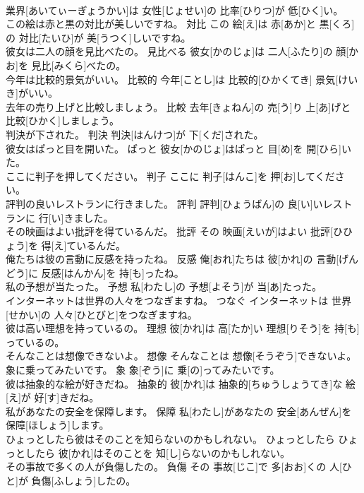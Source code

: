 \documentclass[8pt]{extreport}
\begin{document}
\begin{CJK}{UTF8}{min}
\\	業界[あいてぃーぎょうかい]は 女性[じょせい]の 比率[ひりつ]が 低[ひく]い。	
\\	この絵は赤と黒の対比が美しいですね。	対比	この 絵[え]は 赤[あか]と 黒[くろ]の 対比[たいひ]が 美[うつく]しいですね。	
\\	彼女は二人の顔を見比べたの。	見比べる	彼女[かのじょ]は 二人[ふたり]の 顔[かお]を 見比[みくら]べたの。	
\\	今年は比較的景気がいい。	比較的	今年[ことし]は 比較的[ひかくてき] 景気[けいき]がいい。	
\\	去年の売り上げと比較しましょう。	比較	去年[きょねん]の 売[う]り 上[あ]げと 比較[ひかく]しましょう。	
\\	判決が下された。	判決	判決[はんけつ]が 下[くだ]された。	
\\	彼女はぱっと目を開いた。	ぱっと	彼女[かのじょ]はぱっと 目[め]を 開[ひら]いた。	
\\	ここに判子を押してください。	判子	ここに 判子[はんこ]を 押[お]してください。	
\\	評判の良いレストランに行きました。	評判	評判[ひょうばん]の 良[い]いレストランに 行[い]きました。	
\\	その映画はよい批評を得ているんだ。	批評	その 映画[えいが]はよい 批評[ひひょう]を 得[え]ているんだ。	
\\	俺たちは彼の言動に反感を持ったね。	反感	俺[おれ]たちは 彼[かれ]の 言動[げんどう]に 反感[はんかん]を 持[も]ったね。	
\\	私の予想が当たった。	予想	私[わたし]の 予想[よそう]が 当[あ]たった。	
\\	インターネットは世界の人々をつなぎますね。	つなぐ	インターネットは 世界[せかい]の 人々[ひとびと]をつなぎますね。	
\\	彼は高い理想を持っているの。	理想	彼[かれ]は 高[たか]い 理想[りそう]を 持[も]っているの。	
\\	そんなことは想像できないよ。	想像	そんなことは 想像[そうぞう]できないよ。	
\\	象に乗ってみたいです。	象	象[ぞう]に 乗[の]ってみたいです。	
\\	彼は抽象的な絵が好きだね。	抽象的	彼[かれ]は 抽象的[ちゅうしょうてき]な 絵[え]が 好[す]きだね。	
\\	私があなたの安全を保障します。	保障	私[わたし]があなたの 安全[あんぜん]を 保障[ほしょう]します。	
\\	ひょっとしたら彼はそのことを知らないのかもしれない。	ひょっとしたら	ひょっとしたら 彼[かれ]はそのことを 知[し]らないのかもしれない。	
\\	その事故で多くの人が負傷したの。	負傷	その 事故[じこ]で 多[おお]くの 人[ひと]が 負傷[ふしょう]したの。	

\end{CJK}
\end{document}
